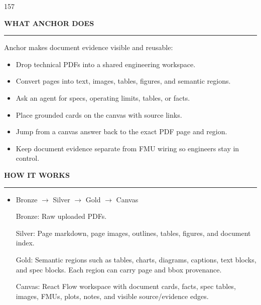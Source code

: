 \documentclass{article}
\newcommand{\panelhead}[1]{%
  \par\addvspace{5mm}%
  {\headingfont\bfseries\fontsize{14pt}{17pt}\selectfont
   \MakeUppercase{#1}\par}%
  \nopagebreak\vspace{1mm}%
  \textcolor{accent}{\rule{32mm}{1.5pt}}\par
  \vspace{1.5mm}%
}
\newcommand{\arr}{\ensuremath{\rightarrow}}
\begin{document}
\begin{textblock}{157}
  \panelhead{What Anchor Does}
  Anchor makes document evidence visible and reusable:
  \begin{itemize}\setlength{\itemsep}{1.5pt}\setlength{\parsep}{1pt}\setlength{\leftmargin}{4mm}
    \item Drop technical PDFs into a shared engineering workspace.
    \item Convert pages into text, images, tables, figures, and semantic regions.
    \item Ask an agent for specs, operating limits, tables, or facts.
    \item Place grounded cards on the canvas with source links.
    \item Jump from a canvas answer back to the exact PDF page and region.
    \item Keep document evidence separate from FMU wiring so engineers stay in control.
  \end{itemize}

  \panelhead{How It Works}
  \begin{itemize}\setlength{\itemsep}{1.5pt}\setlength{\parsep}{1pt}\setlength{\leftmargin}{4mm}
    \item Bronze $\rightarrow$ Silver $\rightarrow$ Gold $\rightarrow$ Canvas
    \par Bronze:
    Raw uploaded PDFs.
    \par Silver:
    Page markdown, page images, outlines, tables, figures, and document index.
    \par Gold:
    Semantic regions such as tables, charts, diagrams, captions, text blocks, and
    spec blocks. Each region can carry page and bbox provenance.
    \par Canvas:
    React Flow workspace with document cards, facts, spec tables, images, FMUs,
    plots, notes, and visible source/evidence edges.
  \end{itemize}



\end{textblock}
\end{document}
